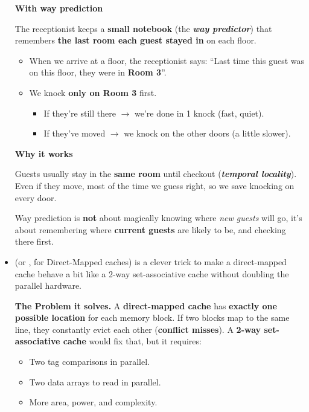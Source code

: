 \begin{itemize}
\begin{examplebox}
        \begin{flushleft}
            \textcolor{Green3}{ \textbf{With way prediction}}
        \end{flushleft}
        The receptionist keeps a \textbf{small notebook} (the \textbf{\emph{way predictor}}) that remembers \textbf{the last room each guest stayed in} on each floor.
        \begin{itemize}
            \item When we arrive at a floor, the receptionist says: ``Last time this guest was on this floor, they were in \textbf{Room 3}''.
            \item We knock \textbf{only on Room 3} first.
            \begin{itemize}
                \item If they're still there $\rightarrow$ we're done in 1 knock (fast, quiet).
                \item If they've moved $\rightarrow$ we knock on the other doors (a little slower).
            \end{itemize}
        \end{itemize}

        \begin{flushleft}
            \textcolor{Green3}{ \textbf{Why it works}}
        \end{flushleft}
        Guests usually stay in the \textbf{same room} until checkout (\textbf{\emph{temporal locality}}). Even if they move, most of the time we guess right, so we save knocking on every door.

        \highspace
        Way prediction is \textbf{not} about magically knowing where \emph{new guests} will go, it's about remembering where \textbf{current guests} are likely to be, and checking there first.
    \end{examplebox}


    \item {} (or , for Direct-Mapped caches) is a clever trick to make a direct-mapped cache behave a bit like a 2-way set-associative cache without doubling the parallel hardware.
    
    \textcolor{Red2}{ \textbf{The Problem it solves.}} A \textbf{direct-mapped cache} has \textbf{exactly one possible location} for each memory block. If two blocks map to the same line, they constantly evict each other (\textbf{conflict misses}). A \textbf{2-way set-associative cache} would fix that, but it requires:
    \begin{itemize}
        \item Two tag comparisons in parallel.
        \item Two data arrays to read in parallel.
        \item More area, power, and complexity.
    \end{itemize}


\end{itemize}
